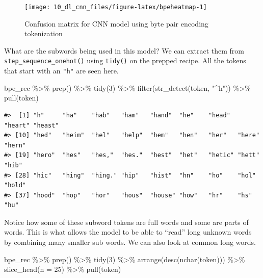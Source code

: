 \documentclass[
]{krantz}
\makeatletter
\newenvironment{Shaded}{\begin{snugshade}}{\end{snugshade}}
\newcommand{\AttributeTok}[1]{\textcolor[rgb]{0.77,0.63,0.00}{#1}}
\newcommand{\DecValTok}[1]{\textcolor[rgb]{0.00,0.00,0.81}{#1}}
\newcommand{\FunctionTok}[1]{\textcolor[rgb]{0.00,0.00,0.00}{#1}}
\newcommand{\NormalTok}[1]{#1}
\newcommand{\SpecialCharTok}[1]{\textcolor[rgb]{0.00,0.00,0.00}{#1}}
\newcommand{\StringTok}[1]{\textcolor[rgb]{0.31,0.60,0.02}{#1}}
\newenvironment{kframe}{%
\medskip{}
\setlength{\fboxsep}{.8em}
 \def\at@end@of@kframe{}%
 \ifinner\ifhmode%
  \def\at@end@of@kframe{\end{minipage}}%
  \begin{minipage}{\columnwidth}%
 \fi\fi%
 \def\FrameCommand##1{\hskip\@totalleftmargin \hskip-\fboxsep
 \colorbox{shadecolor}{##1}\hskip-\fboxsep
     \hskip-\linewidth \hskip-\@totalleftmargin \hskip\columnwidth}%
 \MakeFramed {\advance\hsize-\width
   \@totalleftmargin\z@ \linewidth\hsize
   \@setminipage}}%
 {\par\unskip\endMakeFramed%
 \at@end@of@kframe}
\renewenvironment{Shaded}{\begin{kframe}}{\end{kframe}}
\makeatother
\begin{document}
\begin{figure}

{\centering \texttt{[image: 10\_dl\_cnn\_files/figure-latex/bpeheatmap-1]} 

}

\caption{Confusion matrix for CNN model using byte pair encoding tokenization}\label{fig:bpeheatmap}
\end{figure}

What are the subwords being used in this model? We can extract them from \texttt{step\_sequence\_onehot()} using \texttt{tidy()} on the prepped recipe. All the tokens that start with an \texttt{"h"} are seen here.

\begin{Shaded}
\begin{Highlighting}[]
\NormalTok{bpe\_rec }\SpecialCharTok{\%\textgreater{}\%}
  \FunctionTok{prep}\NormalTok{() }\SpecialCharTok{\%\textgreater{}\%}
  \FunctionTok{tidy}\NormalTok{(}\DecValTok{3}\NormalTok{) }\SpecialCharTok{\%\textgreater{}\%}
  \FunctionTok{filter}\NormalTok{(}\FunctionTok{str\_detect}\NormalTok{(token, }\StringTok{"\^{}h"}\NormalTok{)) }\SpecialCharTok{\%\textgreater{}\%}
  \FunctionTok{pull}\NormalTok{(token)}
\end{Highlighting}
\end{Shaded}

\begin{verbatim}
#>  [1] "h"     "ha"    "hab"   "ham"   "hand"  "he"    "head"  "heart" "heast"
#> [10] "hed"   "heim"  "hel"   "help"  "hem"   "hen"   "her"   "here"  "hern" 
#> [19] "hero"  "hes"   "hes,"  "hes."  "hest"  "het"   "hetic" "hett"  "hib"  
#> [28] "hic"   "hing"  "hing." "hip"   "hist"  "hn"    "ho"    "hol"   "hold" 
#> [37] "hood"  "hop"   "hor"   "hous"  "house" "how"   "hr"    "hs"    "hu"
\end{verbatim}

Notice how some of these subword tokens are full words and some are parts of words. This is what allows the model to be able to ``read'' long unknown words by combining many smaller sub words.
We can also look at common long words.

\begin{Shaded}
\begin{Highlighting}[]
\NormalTok{bpe\_rec }\SpecialCharTok{\%\textgreater{}\%}
  \FunctionTok{prep}\NormalTok{() }\SpecialCharTok{\%\textgreater{}\%}
  \FunctionTok{tidy}\NormalTok{(}\DecValTok{3}\NormalTok{) }\SpecialCharTok{\%\textgreater{}\%}
  \FunctionTok{arrange}\NormalTok{(}\FunctionTok{desc}\NormalTok{(}\FunctionTok{nchar}\NormalTok{(token))) }\SpecialCharTok{\%\textgreater{}\%}
  \FunctionTok{slice\_head}\NormalTok{(}\AttributeTok{n =} \DecValTok{25}\NormalTok{) }\SpecialCharTok{\%\textgreater{}\%}
  \FunctionTok{pull}\NormalTok{(token)}
\end{Highlighting}
\end{Shaded}
\end{document}
